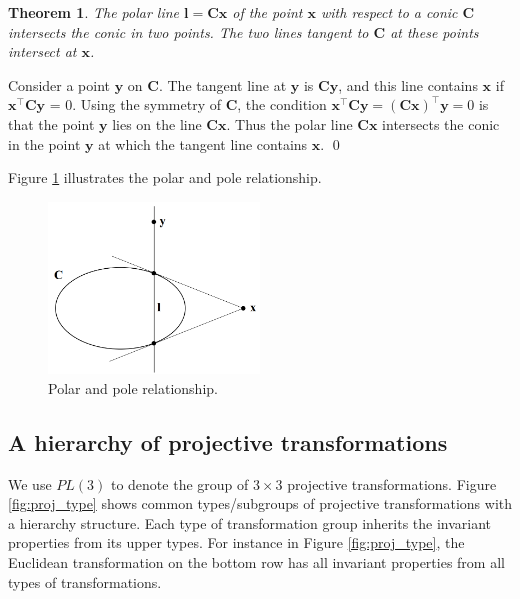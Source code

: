 \documentclass[12pt]{article}
\newtheorem{theorem}{Theorem}[section]
\numberwithin{equation}{section}
\renewenvironment{proof}{{\bfseries Proof.}}{\qed \\}
\begin{document}
\begin{theorem}
The polar line $\mathbf{l = Cx}$ of the point $\mathbf{x}$ with respect to a conic $\mathbf{C}$ intersects the conic in two points. The two lines tangent to $\mathbf{C}$ at these points intersect at $\mathbf{x}$.
\end{theorem}
\begin{proof}
Consider a point $\mathbf{y}$ on $\mathbf{C}$. The tangent line at $\mathbf{y}$ is $\mathbf{Cy}$, and this line contains $\mathbf{x}$ if $\mathbf{x^\top Cy}$ = 0. Using the symmetry of $\mathbf{C}$, the condition $\mathbf{x^\top Cy = (Cx)^\top y} = 0$ is that the point $\mathbf{y}$ lies on the line $\mathbf{Cx}$. Thus the polar line $\mathbf{Cx}$ intersects the conic in the point $\mathbf{y}$ at which the tangent line contains $\mathbf{x}$. 
\end{proof}

Figure \ref{fig:polar_pole} illustrates the polar and pole relationship.

\begin{figure}[h]
\begin{center}
\includegraphics[width=0.5\textwidth]{conic_polar_pole.png}
\end{center}
\caption{Polar and pole relationship.}
\label{fig:polar_pole}
\end{figure}

\subsection{A hierarchy of projective transformations}
\label{2d_proj_trans}

We use $PL(3)$ to denote the group of $3\times 3$ projective transformations. Figure \ref{fig:proj_type} shows common types/subgroups of projective transformations with a hierarchy structure. Each type of transformation group inherits the invariant properties from its upper types. For instance in Figure \ref{fig:proj_type}, the Euclidean transformation on the bottom row has all invariant properties from all types of transformations.
\end{document}
